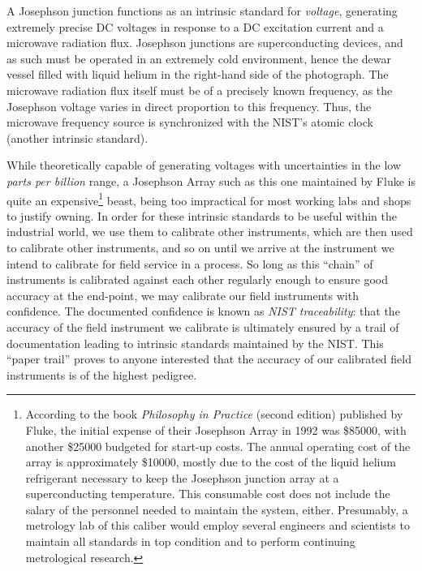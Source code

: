 A Josephson junction functions as an intrinsic standard for \textit{voltage}, generating extremely precise DC voltages in response to a DC excitation current and a microwave radiation flux.  Josephson junctions are superconducting devices, and as such must be operated in an extremely cold environment, hence the dewar vessel filled with liquid helium in the right-hand side of the photograph.  The microwave radiation flux itself must be of a precisely known frequency, as the Josephson voltage varies in direct proportion to this frequency.  Thus, the microwave frequency source is synchronized with the NIST's atomic clock (another intrinsic standard).

While theoretically capable of generating voltages with uncertainties in the low \textit{parts per billion} range, a Josephson Array such as this one maintained by Fluke is quite an expensive\footnote{According to the book \textit{Philosophy in Practice} (second edition) published by Fluke, the initial expense of their Josephson Array in 1992 was \$85000, with another \$25000 budgeted for start-up costs.  The annual operating cost of the array is approximately \$10000, mostly due to the cost of the liquid helium refrigerant necessary to keep the Josephson junction array at a superconducting temperature.  This consumable cost does not include the salary of the personnel needed to maintain the system, either.  Presumably, a metrology lab of this caliber would employ several engineers and scientists to maintain all standards in top condition and to perform continuing metrological research.} beast, being too impractical for most working labs and shops to justify owning.  In order for these intrinsic standards to be useful within the industrial world, we use them to calibrate other instruments, which are then used to calibrate other instruments, and so on until we arrive at the instrument we intend to calibrate for field service in a process.  So long as this ``chain'' of instruments is calibrated against each other regularly enough to ensure good accuracy at the end-point, we may calibrate our field instruments with confidence.  The documented confidence is known as \textit{NIST traceability}: that the accuracy of the field instrument we calibrate is ultimately ensured by a trail of documentation leading to intrinsic standards maintained by the NIST.  This ``paper trail'' proves to anyone interested that the accuracy of our calibrated field instruments is of the highest pedigree.    






